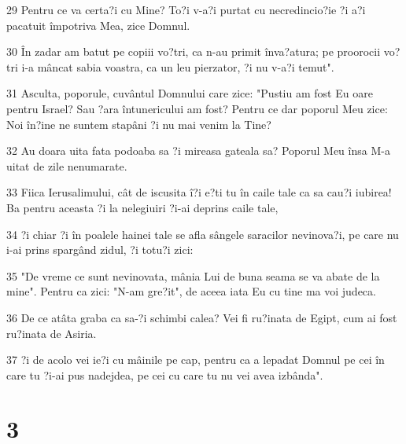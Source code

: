 \par 29 Pentru ce va certa?i cu Mine? To?i v-a?i purtat cu necredincio?ie ?i a?i pacatuit împotriva Mea, zice Domnul.
\par 30 În zadar am batut pe copiii vo?tri, ca n-au primit înva?atura; pe proorocii vo?tri i-a mâncat sabia voastra, ca un leu pierzator, ?i nu v-a?i temut".
\par 31 Asculta, poporule, cuvântul Domnului care zice: "Pustiu am fost Eu oare pentru Israel? Sau ?ara întunericului am fost? Pentru ce dar poporul Meu zice: Noi în?ine ne suntem stapâni ?i nu mai venim la Tine?
\par 32 Au doara uita fata podoaba sa ?i mireasa gateala sa? Poporul Meu însa M-a uitat de zile nenumarate.
\par 33 Fiica Ierusalimului, cât de iscusita î?i e?ti tu în caile tale ca sa cau?i iubirea! Ba pentru aceasta ?i la nelegiuiri ?i-ai deprins caile tale,
\par 34 ?i chiar ?i în poalele hainei tale se afla sângele saracilor nevinova?i, pe care nu i-ai prins spargând zidul, ?i totu?i zici:
\par 35 "De vreme ce sunt nevinovata, mânia Lui de buna seama se va abate de la mine". Pentru ca zici: "N-am gre?it", de aceea iata Eu cu tine ma voi judeca.
\par 36 De ce atâta graba ca sa-?i schimbi calea? Vei fi ru?inata de Egipt, cum ai fost ru?inata de Asiria.
\par 37 ?i de acolo vei ie?i cu mâinile pe cap, pentru ca a lepadat Domnul pe cei în care tu ?i-ai pus nadejdea, pe cei cu care tu nu vei avea izbânda".

\chapter{3}

